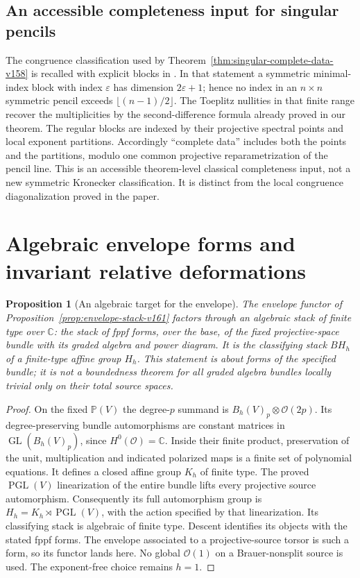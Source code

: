 \documentclass[11pt,reqno]{amsart}
\numberwithin{equation}{section}
\newtheorem{proposition}[theorem]{Proposition}
\theoremstyle{definition}\newtheorem{definition}[theorem]{Definition}
\theoremstyle{remark}\newtheorem{remark}[theorem]{Remark}
\newcommand{\C}{\mathbb C}\newcommand{\Q}{\mathbb Q}
\newcommand{\Pj}{\mathbb P}\newcommand{\A}{\mathbb A}
\newcommand{\OO}{\mathcal O}\newcommand{\II}{\mathcal I}
\begin{document}
\subsection{An accessible completeness input for singular pencils}
The congruence classification used by
Theorem~\ref{thm:singular-complete-data-v158} is recalled with explicit
blocks in \cite[Theorem~2.1]{DeTeranDmytryshynDopico2018v161}.
In that statement a symmetric minimal-index block with index
$\varepsilon$ has dimension $2\varepsilon+1$; hence no index in an
$n\times n$ symmetric pencil exceeds $\lfloor(n-1)/2\rfloor$.
The Toeplitz nullities in that finite range recover the
multiplicities by the second-difference formula already proved in
our theorem. The regular blocks are indexed by their projective
spectral points and local exponent partitions. Accordingly
``complete data'' includes both the points and the partitions,
modulo one common projective reparametrization of the pencil line.
This is an accessible theorem-level classical completeness input,
not a new symmetric Kronecker classification. It is distinct from
the local congruence diagonalization proved in the paper.


\section{Algebraic envelope forms and invariant relative deformations}
\label{sec:invariant-deformations-v162}
\begin{proposition}[An algebraic target for the envelope]
\label{prop:algebraic-envelope-v162}
The envelope functor of Proposition~\ref{prop:envelope-stack-v161}
factors through an algebraic stack of finite type over $\C$: the
stack of fppf forms, over the base, of the fixed projective-space
bundle with its graded algebra and power diagram. It is the classifying
stack $BH_h$ of a finite-type affine group $H_h$. This statement is
about forms of the specified bundle; it is not a boundedness theorem
for all graded algebra bundles locally trivial only on their total
source spaces.
\end{proposition}
\begin{proof}
On the fixed $\Pj(V)$ the degree-$p$ summand is
$B_h(V)_p\otimes\OO(2p)$. Its degree-preserving bundle automorphisms
are constant matrices in $\operatorname{GL}(B_h(V)_p)$, since
$H^0(\OO)=\C$. Inside their finite product, preservation of the unit,
multiplication and indicated polarized maps is a finite set of
polynomial equations. It defines a closed affine group $K_h$ of
finite type. The proved $\operatorname{PGL}(V)$ linearization of
the entire bundle lifts every projective source automorphism.
Consequently its full automorphism group is
$H_h=K_h\rtimes\operatorname{PGL}(V)$, with the action specified by
that linearization. Its classifying stack is algebraic of finite
type. Descent identifies its objects with the stated fppf forms.
The envelope associated to a projective-source torsor is such a form,
so its functor lands here. No global $\OO(1)$ on a Brauer-nonsplit
source is used. The exponent-free choice remains $h=1$.
\end{proof}
\end{document}

